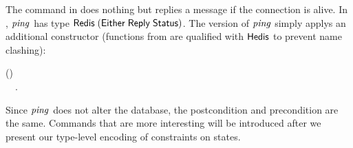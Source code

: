 The command  in \Redis{} does nothing but replies a message
 if the connection is alive. In \Hedis{}, \ensuremath{\Varid{ping}} has type
\ensuremath{\Conid{Redis}\;(\Conid{Either}\;\Conid{Reply}\;\Conid{Status})}. The \Edis{} version of \ensuremath{\Varid{ping}} simply
applys an additional constructor (functions from \Hedis{} are qualified with
\ensuremath{\Conid{Hedis}} to prevent name clashing):
\begin{hscode}\SaveRestoreHook
{}%
%
\>[B]{}\mathbin{::}\;\;\;(\;\;){}\<[E]%
\\
\>[B]{}\mathrel{=}\;~~.{}\<[E]%
\ColumnHook
\end{hscode}\resethooks
Since \ensuremath{\Varid{ping}} does not alter the database, the postcondition and precondition
are the same. Commands that are more interesting will be introduced after
we present our type-level encoding of constraints on states.
